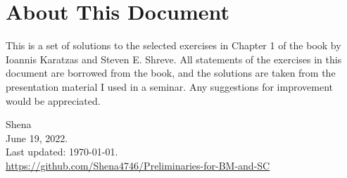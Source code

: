 \documentclass{report}
\begin{document}
\section*{About This Document}
This is a set of solutions to the selected exercises in Chapter 1 of the book\cite{bmsc:Karatzas-Shreve} by Ioannis Karatzas and Steven E. Shreve. All statements of the exercises in this document are borrowed from the book, and the solutions are taken from the presentation material I used in a seminar. Any suggestions for improvement would be appreciated.
\begin{flushright}
	Shena\\
	June 19, 2022.\\
	Last updated: \today .\\
	\url{https://github.com/Shena4746/Preliminaries-for-BM-and-SC}
\end{flushright}
\end{document}
